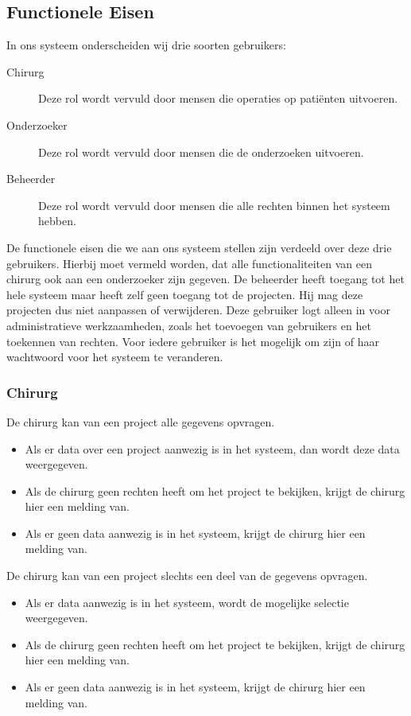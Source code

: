 \subsection{Functionele Eisen}
\label{functionele_eisen}
In ons systeem onderscheiden wij drie soorten gebruikers:
\begin{description}
	\item[Chirurg] Deze rol wordt vervuld door mensen die operaties op pati\"enten uitvoeren.
	\item[Onderzoeker] Deze rol wordt vervuld door mensen die de onderzoeken uitvoeren. 
	\item[Beheerder] Deze rol wordt vervuld door mensen die alle rechten binnen het systeem hebben.
\end{description}
De functionele eisen die we aan ons systeem stellen zijn verdeeld over deze drie gebruikers. 
Hierbij moet vermeld worden, dat alle functionaliteiten van een chirurg ook aan een onderzoeker zijn gegeven.
De beheerder heeft toegang tot het hele systeem maar heeft zelf geen toegang tot de projecten. 
Hij mag deze projecten dus niet aanpassen of verwijderen. 
Deze gebruiker logt alleen in voor administratieve werkzaamheden, zoals het toevoegen van gebruikers en het toekennen van rechten.
Voor iedere gebruiker is het mogelijk om zijn of haar wachtwoord voor het systeem te veranderen.

\subsubsection{Chirurg}

De chirurg kan van een project alle gegevens opvragen.
\begin{itemize}
	\item Als er data over een project aanwezig is in het systeem, dan wordt deze data weergegeven.
	\item Als de chirurg geen rechten heeft om het project te bekijken, krijgt de chirurg hier een melding van.
	\item Als er geen data aanwezig is in het systeem, krijgt de chirurg hier een melding van. 
\end{itemize}

\noindent
De chirurg kan van een project slechts een deel van de gegevens opvragen.
\begin{itemize}
	\item Als er data aanwezig is in het systeem, wordt de mogelijke selectie weergegeven.
	\item Als de chirurg geen rechten heeft om het project te bekijken, krijgt de chirurg hier een melding van.
	\item Als er geen data aanwezig is in het systeem, krijgt de chirurg hier een melding van.
\end{itemize}

